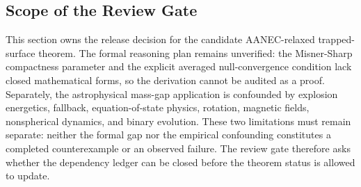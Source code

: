 \documentclass[conference]{IEEEtran}
\begin{document}
\subsection{Scope of the Review Gate}
This section owns the release decision for the candidate AANEC-relaxed trapped-surface theorem. The formal reasoning plan remains unverified: the Misner-Sharp compactness parameter and the explicit averaged null-convergence condition lack closed mathematical forms, so the derivation cannot be audited as a proof. Separately, the astrophysical mass-gap application is confounded by explosion energetics, fallback, equation-of-state physics, rotation, magnetic fields, nonspherical dynamics, and binary evolution. These two limitations must remain separate: neither the formal gap nor the empirical confounding constitutes a completed counterexample or an observed failure. The review gate therefore asks whether the dependency ledger can be closed before the theorem status is allowed to update.~\cite{cite_0ed84243cf171bc4,cite_7a407c865faafd11,cite_cbbced417410bc6c,cite_f634820e22d7a238,cite_fd0f77b2a173c0ab}
\end{document}

